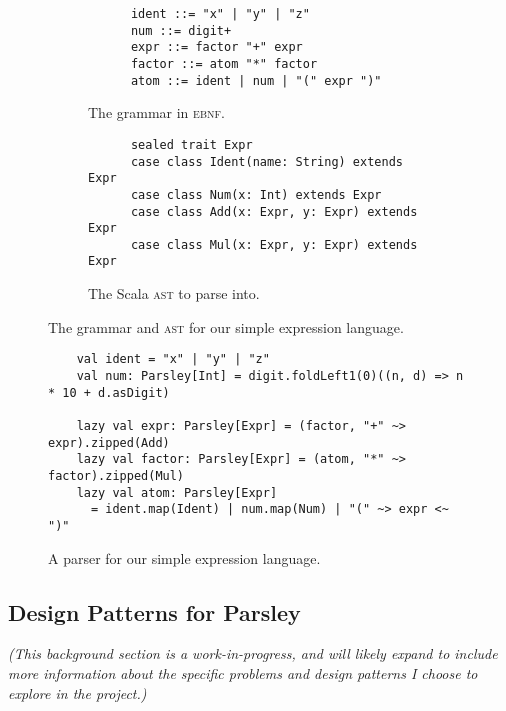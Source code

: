 \begin{figure}[htbp]
  \centering
  \begin{subfigure}{0.6\textwidth}
    \vspace{3ex} %
    \centering
    \begin{verbatim}
      ident ::= "x" | "y" | "z"
      num ::= digit+
      expr ::= factor "+" expr
      factor ::= atom "*" factor
      atom ::= ident | num | "(" expr ")"
    \end{verbatim}
    \caption{The grammar in \textsc{ebnf}.}
    \label{fig:simple-grammar-ebnf}
  \end{subfigure}
  \begin{subfigure}{0.8\textwidth}
    \vspace{5ex} %
    \centering
    \begin{verbatim}
      sealed trait Expr
      case class Ident(name: String) extends Expr
      case class Num(x: Int) extends Expr
      case class Add(x: Expr, y: Expr) extends Expr
      case class Mul(x: Expr, y: Expr) extends Expr
    \end{verbatim}
    \caption{The Scala \textsc{ast} to parse into.}
    \label{fig:simple-grammar-ast}
  \end{subfigure}
  \caption{The grammar and \textsc{ast} for our simple expression language.}
\end{figure}

\begin{figure}[htbp]
  \centering
  \begin{verbatim}
    val ident = "x" | "y" | "z"
    val num: Parsley[Int] = digit.foldLeft1(0)((n, d) => n * 10 + d.asDigit)

    lazy val expr: Parsley[Expr] = (factor, "+" ~> expr).zipped(Add)
    lazy val factor: Parsley[Expr] = (atom, "*" ~> factor).zipped(Mul)
    lazy val atom: Parsley[Expr]
      = ident.map(Ident) | num.map(Num) | "(" ~> expr <~ ")"
  \end{verbatim}
  \caption{A parser for our simple expression language.}
  \label{fig:simple-grammar-parser}
\end{figure}

\subsection{Design Patterns for Parsley}
\textit{(This background section is a work-in-progress, and will likely expand to include more information about the specific problems and design patterns I choose to explore in the project.)}


